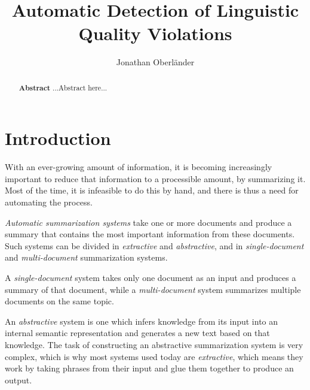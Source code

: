 \documentclass[a4paper,10pt]{scrartcl}
\author{Jonathan Oberländer}
\title{Automatic Detection of Linguistic Quality Violations}
\theoremstyle{style}
\begin{document}


\thispagestyle{empty}
\begin{abstract}
\setlength{\parskip}{2ex plus 0.5ex minus 0.2ex}
\textbf{Abstract} \quad ...Abstract here...

\end{abstract}
\newpage

\thispagestyle{empty}
\tableofcontents
\newpage

\setcounter{page}{1}		%
\newpage







\maketableofcontents

\section{Introduction}
With an ever-growing amount of information, it is becoming increasingly important to reduce that information to a processible amount, by summarizing it. Most of the time, it is infeasible to do this by hand, and there is thus a need for automating the process.

\textit{Automatic summarization systems} take one or more documents and produce a summary that contains the most important information from these documents. Such systems can be divided in \textit{extractive} and \textit{abstractive}, and in \textit{single-document} and \textit{multi-document} summarization systems.

A \textit{single-document} system takes only one document as an input and produces a summary of that document, while a \textit{multi-document} system summarizes multiple documents on the same topic.

An \textit{abstractive} system is one which infers knowledge from its input into an internal semantic representation and generates a new text based on that knowledge. The task of constructing an abstractive summarization system is very complex, which is why most systems used today are \textit{extractive}, which means they work by taking phrases from their input and glue them together to produce an output.
\end{document}
